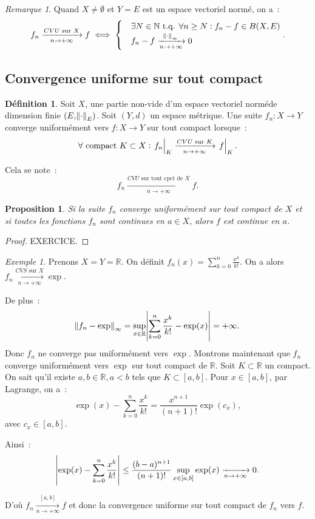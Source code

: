 \documentclass{report}
\newtheorem{prp}[thm]{Proposition}
\theoremstyle{definition}
\newtheorem{déf}[thm]{Définition}
\theoremstyle{remark}
\newtheorem*{rmq}{Remarque}
\newtheorem{ex}{Exemple}[chapter]
\newcommand{\R}{\mathbb R}
\newcommand{\N}{\mathbb N}
\newcommand{\tq}{\text{ t.q. }}
\newcommand{\CONV}[5]{\xrightarrow[#2 \to #3]{#4 \text{ #5 } #1}}
\newcommand{\CVS}[3]{\CONV{#1}{#2}{#3}{CVS}{sur}}
\newcommand{\CVU}[3]{\CONV{#1}{#2}{#3}{CVU}{sur}}
\newcommand{\CVUc}[3]{\CONV{#1}{#2}{#3}{CVU}{sur tout cpct de}}
\newcommand{\restr}[2]{\left.#1\vphantom{\big|}\right|_{#2}}
\newcommand{\pinfty}{{+\infty}}
\newcommand{\evn}{espace vectoriel normé}
\begin{document}
			\begin{rmq} Quand $X \neq \emptyset$ et $Y = E$ est un \evn, on a~:
			\[f_n \CVU Xn\pinfty f \iff
				\begin{cases}&\exists N \in \N \tq \forall n \geq N : f_n - f \in B(X, E) \\ &f_n - f \xrightarrow[n \to \pinfty]{\norm \cdot_\infty} 0\end{cases}.\]
			\end{rmq}

		\subsection{Convergence uniforme sur tout compact}
			\begin{déf} Soit $X$, une partie non-vide d'un \evn de dimension finie $(E, \norm \cdot_E)$. Soit $(Y, d)$ un espace métrique.
			Une suite $f_n : X \to Y$ converge uniformément vers $f : X \to Y$ sur tout compact lorsque~:
			\[\forall \text{ compact } K \subset X : \restr {f_n}K \CVU Kn\pinfty \restr fK.\]

			Cela se note~:
			\[f_n \CVUc Xn\pinfty f.\]
			\end{déf}

			\begin{prp}\label{prp:cvuccontinues} Si la suite $f_n$ converge uniformément sur tout compact de $X$ et si toutes les fonctions $f_n$ sont continues
			en $a \in X$, alors $f$ est continue en $a$.
			\end{prp}

			\begin{proof} EXERCICE.
			\end{proof}

			\begin{ex} Prenons $X = Y = \R$. On définit $f_n(x) = \sum_{k=0}^n\frac {x^k}{k!}$. On a alors $f_n \CVS Xn\pinfty \exp$.

			De plus~:
			\[\norm {f_n - \exp}_\infty = \sup_{x \in \R} \abs {\sum_{k=0}^n\frac {x^k}{k!} - \exp(x)} = \pinfty.\]
			Donc $f_n$ ne converge pas uniformément vers $\exp$. Montrons maintenant que $f_n$ converge uniformément vers $\exp$ sur tout compact de $\R$.
			Soit $K \subset \R$ un compact. On sait qu'il existe $a, b \in \R, a < b$ tels que $K \subset [a, b]$. Pour $x \in [a, b]$, par Lagrange, on a~:
			\[\exp(x) - \sum_{k=0}^n\frac {x^k}{k!} = \frac {x^{n+1}}{(n+1)!}\exp(c_x),\]
			avec $c_x \in [a, b]$.

			Ainsi~:
			\[\abs {\exp(x) - \sum_{k=0}^n\frac {x^k}{k!}} \leq \frac {(b-a)^{n+1}}{(n+1)!}\sup_{x \in [a, b]}\exp(x) \xrightarrow[n \to \pinfty]{} 0.\]

			D'où $f_n \xrightarrow[n \to \pinfty]{[a, b]} f$ et donc la convergence uniforme sur tout compact de $f_n$ vers $f$.
			\end{ex}
\end{document}
